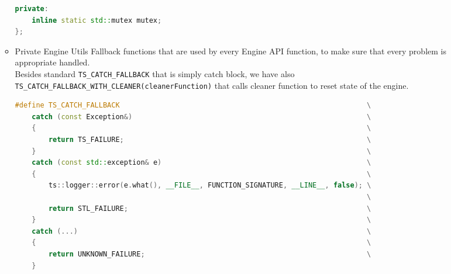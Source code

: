 \begin{itemize}
\begin{itemize}
\begin{lstlisting}[language=c++, caption=Singleton of Public Engine Utils(./engine/include/tsengine/utils.hpp)]
private:
    inline static std::mutex mutex;
};
\end{lstlisting}
        \item Private Engine Utils
Fallback functions that are used by every Engine API function, to make sure that every problem is appropriate handled.\\
\label{fallbacks}
Besides standard \texttt{TS\_CATCH\_FALLBACK} that is simply catch block, we have also \texttt{TS\_CATCH\_FALLBACK\_WITH\_CLEANER(cleanerFunction)} that calls cleaner function to reset state of the engine.
\begin{lstlisting}[language=c++, caption=Private Engine Utils (./engine/src/internal\_utils.h)]
#define TS_CATCH_FALLBACK                                                           \
    catch (const Exception&)                                                        \
    {                                                                               \
        return TS_FAILURE;                                                          \
    }                                                                               \
    catch (const std::exception& e)                                                 \
    {                                                                               \
        ts::logger::error(e.what(), __FILE__, FUNCTION_SIGNATURE, __LINE__, false); \
                                                                                    \
        return STL_FAILURE;                                                         \
    }                                                                               \
    catch (...)                                                                     \
    {                                                                               \
        return UNKNOWN_FAILURE;                                                     \
    }


\end{lstlisting}
\end{itemize}
\end{itemize}
